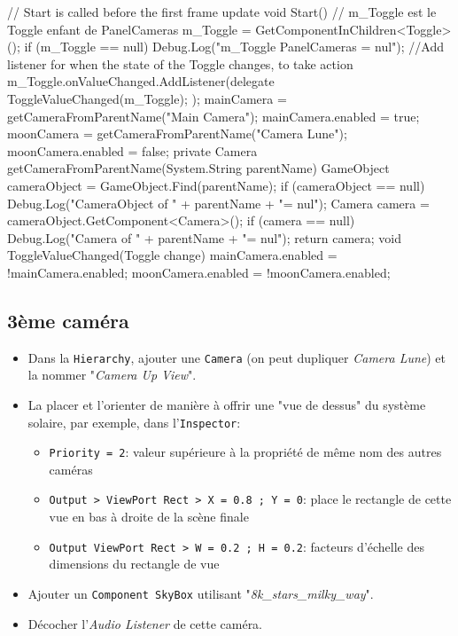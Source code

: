 \documentclass[a4paper,10pt]{article}
\newenvironment{solution}%
{\begin{tcolorbox}[breakable,colback=red!5!white,colframe=red!75!black,title=Solution]}%
{\end{tcolorbox}}
\newenvironment{boxcode}%
{\begin{tcolorbox}[breakable,colback=gray!5!white,colframe=black]}%
	{\end{tcolorbox}}
\begin{document}
\begin{solution}
\begin{boxcode}
\begin{csharpsansbord}
{	// Start is called before the first frame update
	void Start()
	{
		// m_Toggle est le Toggle enfant de PanelCameras
		m_Toggle = GetComponentInChildren<Toggle>();
		if (m_Toggle == null)
		Debug.Log("m_Toggle PanelCameras = nul");
		//Add listener for when the state of the Toggle changes, to take action
		m_Toggle.onValueChanged.AddListener(delegate {
			ToggleValueChanged(m_Toggle);
		});
		mainCamera = getCameraFromParentName("Main Camera");
		mainCamera.enabled = true;
		moonCamera = getCameraFromParentName("Camera Lune");
		moonCamera.enabled = false;
	}
	private Camera getCameraFromParentName(System.String parentName) {
		GameObject cameraObject = GameObject.Find(parentName);
		if (cameraObject == null)
		Debug.Log("CameraObject of " + parentName + "= nul");
		Camera camera = cameraObject.GetComponent<Camera>();
		if (camera == null)
		Debug.Log("Camera of " + parentName + "= nul");
		return camera;
	}
	void ToggleValueChanged(Toggle change)
	{
		mainCamera.enabled = !mainCamera.enabled;
		moonCamera.enabled = !moonCamera.enabled;
	}
}	
\end{csharpsansbord}
\end{boxcode}
	
	\subsection{3ème caméra}
\begin{itemize}
	\item Dans la \texttt{Hierarchy}, ajouter une \texttt{Camera} (on peut dupliquer \textit{Camera Lune}) et la nommer "\textit{Camera Up View}".
	\item La placer et l'orienter de manière à offrir une "vue de dessus" du système solaire, par exemple, dans l'\texttt{Inspector}:
	\begin{itemize}
		\item \texttt{Priority = 2}: valeur supérieure à la propriété de même nom des autres caméras 
		\item \texttt{Output > ViewPort Rect > X = 0.8 ; Y = 0}: place le rectangle de cette vue en bas à droite de la scène finale
		\item \texttt{Output ViewPort Rect > W = 0.2 ; H = 0.2}: facteurs d'échelle des dimensions du rectangle de vue
	\end{itemize}
	\item Ajouter un \texttt{Component SkyBox} utilisant "\textit{8k\_stars\_milky\_way}".
	\item Décocher l'\textit{Audio Listener} de cette caméra.
\end{itemize}	
\end{solution}
\end{document}

